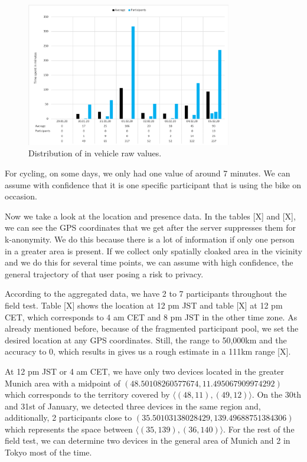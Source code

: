 \begin{figure}[htpb]
  \centering
  \includegraphics[width=0.8\textwidth]{figures/Diagram_Vehicle.png}
  \caption{Distribution of in vehicle raw values.} \label{fig:Diagram_Vehicle}
\end{figure}

For cycling, on some days, we only had one value of around 7 minutes. We can assume with confidence that it is one specific participant that is using the bike on occasion.

Now we take a look at the location and presence data. In the tables [X] and [X], we can see the GPS coordinates that we get after the server suppresses them for k-anonymity. We do this because there is a lot of information if only one person in a greater area is present. If we collect only spatially cloaked area in the vicinity and we do this for several time points, we can assume with high confidence, the general trajectory of that user posing a risk to privacy.

According to the aggregated data, we have 2 to 7 participants throughout the field test. Table [X] shows the location at 12 pm JST and table [X] at 12 pm CET, which corresponds to 4 am CET and 8 pm JST in the other time zone. As already mentioned before, because of the fragmented participant pool, we set the desired location at any GPS coordinates. Still, the range to 50,000km and the accuracy to 0, which results in gives us a rough estimate in a 111km range [X].

At 12 pm JST or 4 am CET, we have only two devices located in the greater Munich area with a midpoint of \((48.50108260577674, 11.495067909974292)\) which corresponds to the territory covered by \(\langle(48, 11),(49, 12)\rangle\). On the 30th and 31st of January, we detected three devices in the same region and, additionally, 2 participants close to \((35.50103138028429, 139.49688751384306)\) which represents the space between \(\langle(35, 139),(36, 140)\rangle\). For the rest of the field test, we can determine two devices in the general area of Munich and 2 in Tokyo most of the time.

